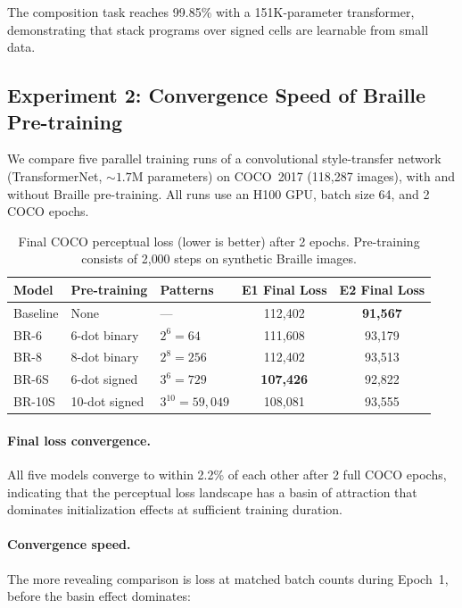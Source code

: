 \documentclass[11pt,a4paper]{article}
\begin{document}
The composition task reaches 99.85\% with a 151K-parameter transformer,
demonstrating that stack programs over signed cells are learnable
from small data.

\subsection{Experiment 2: Convergence Speed of Braille Pre-training}

We compare five parallel training runs of a convolutional
style-transfer network (TransformerNet, ${\sim}1.7\text{M}$ parameters)
on COCO~2017 (118{,}287 images), with and without Braille pre-training.
All runs use an H100 GPU, batch size 64, and 2 COCO epochs.

\begin{table}[h]
  \centering
  \begin{tabular}{@{}lllcc@{}}
    \toprule
    Model & Pre-training & Patterns & E1 Final Loss & E2 Final Loss \\
    \midrule
    Baseline     & None              & ---         & 112{,}402 & \textbf{91{,}567} \\
    BR-6         & 6-dot binary      & $2^6=64$    & 111{,}608 & 93{,}179 \\
    BR-8         & 8-dot binary      & $2^8=256$   & 112{,}402 & 93{,}513 \\
    BR-6S        & 6-dot signed      & $3^6=729$   & \textbf{107{,}426} & 92{,}822 \\
    BR-10S       & 10-dot signed     & $3^{10}=59{,}049$ & 108{,}081 & 93{,}555 \\
    \bottomrule
  \end{tabular}
  \caption{Final COCO perceptual loss (lower is better) after 2 epochs.
    Pre-training consists of 2{,}000 steps on synthetic Braille images.}
  \label{tab:convergence}
\end{table}

\paragraph{Final loss convergence.}
All five models converge to within 2.2\% of each other after 2 full
COCO epochs, indicating that the perceptual loss landscape has a
basin of attraction that dominates initialization effects at
sufficient training duration.

\paragraph{Convergence speed.}
The more revealing comparison is loss at matched batch counts
during Epoch~1, before the basin effect dominates:
\end{document}
